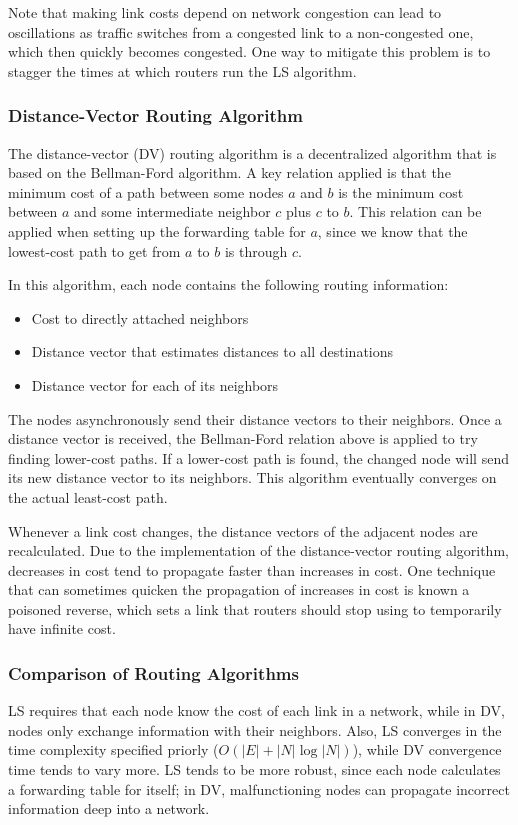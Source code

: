 \documentclass[12pt,titlepage]{article}
\begin{document}
        Note that making link costs depend on network congestion can lead to oscillations as traffic switches from a congested link to a non-congested
        one, which then quickly becomes congested. One way to mitigate this problem is to stagger the times at which routers run the LS algorithm.

      \subsubsection{Distance-Vector Routing Algorithm}
        The distance-vector (DV) routing algorithm is a decentralized algorithm that is based on the Bellman-Ford algorithm. A key relation applied is that
        the minimum cost of a path between some nodes $a$ and $b$ is the minimum cost between $a$ and some intermediate neighbor $c$ plus $c$ to $b$.
        This relation can be applied when setting up the forwarding table for $a$, since we know that the lowest-cost path to get from $a$ to $b$ is
        through $c$.

        In this algorithm, each node contains the following routing information:
        \begin{itemize}
          \item Cost to directly attached neighbors
          \item Distance vector that estimates distances to all destinations
          \item Distance vector for each of its neighbors
        \end{itemize}

        The nodes asynchronously send their distance vectors to their neighbors. Once a distance vector is received, the Bellman-Ford relation above
        is applied to try finding lower-cost paths. If a lower-cost path is found, the changed node will send its new distance vector to its neighbors. This
        algorithm eventually converges on the actual least-cost path.

        Whenever a link cost changes, the distance vectors of the adjacent nodes are recalculated. Due to the implementation of the distance-vector routing
        algorithm, decreases in cost tend to propagate faster than increases in cost. One technique that can sometimes quicken the propagation of increases
        in cost is known a poisoned reverse, which sets a link that routers should stop using to temporarily have infinite cost.

      \subsubsection{Comparison of Routing Algorithms}
        LS requires that each node know the cost of each link in a network, while in DV, nodes only exchange information with their neighbors. Also, LS
        converges in the time complexity specified priorly ($O(|E| + |N|\log{|N|})$), while DV convergence time tends to vary more. LS tends to be more
        robust, since each node calculates a forwarding table for itself; in DV, malfunctioning nodes can propagate incorrect information deep into
        a network.
\end{document}
